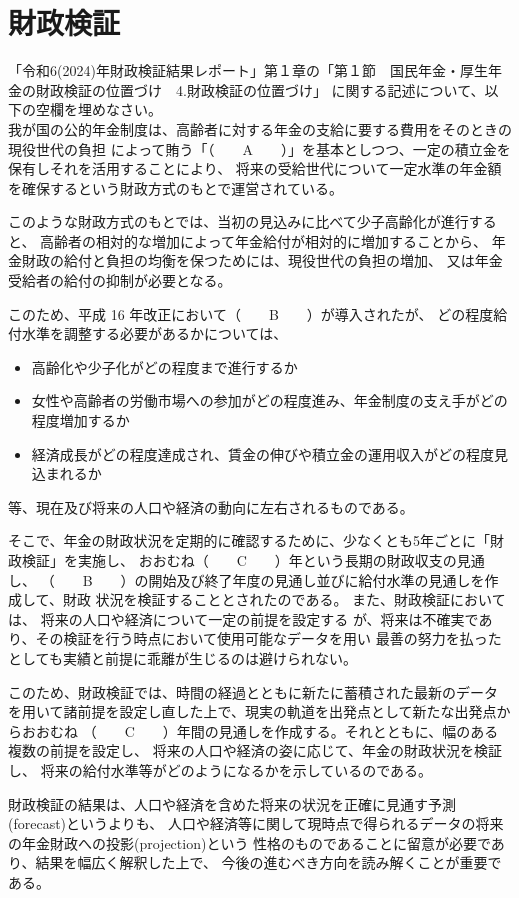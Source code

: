 \section{財政検証}

\begin{fillblank}[自作 2026/11/3]
  「令和6(2024)年財政検証結果レポート」第１章の「第１節　国民年金・厚生年金の財政検証の位置づけ　4.財政検証の位置づけ」
  に関する記述について、以下の空欄を埋めなさい。
\\


  我が国の公的年金制度は、高齢者に対する年金の支給に要する費用をそのときの現役世代の負担
  によって賄う「（　　A　　）」を基本としつつ、一定の積立金を保有しそれを活用することにより、
  将来の受給世代について一定水準の年金額を確保するという財政方式のもとで運営されている。

  このような財政方式のもとでは、当初の見込みに比べて少子高齢化が進行すると、
  高齢者の相対的な増加によって年金給付が相対的に増加することから、
  年金財政の給付と負担の均衡を保つためには、現役世代の負担の増加、
  又は年金受給者の給付の抑制が必要となる。

  このため、平成 16 年改正において（　　B　　）が導入されたが、
  どの程度給付水準を調整する必要があるかについては、
  \begin{itemize}
    \item 高齢化や少子化がどの程度まで進行するか
    \item 女性や高齢者の労働市場への参加がどの程度進み、年金制度の支え手がどの程度増加するか
    \item 経済成長がどの程度達成され、賃金の伸びや積立金の運用収入がどの程度見込まれるか
  \end{itemize}
  等、現在及び将来の人口や経済の動向に左右されるものである。
  
  そこで、年金の財政状況を定期的に確認するために、少なくとも5年ごとに「財政検証」を実施し、
  おおむね（　　C　　）年という長期の財政収支の見通し、
  （　　B　　）の開始及び終了年度の見通し並びに給付水準の見通しを作成して、財政
  状況を検証することとされたのである。 また、財政検証においては、
  将来の人口や経済について一定の前提を設定する
  が、将来は不確実であり、その検証を行う時点において使用可能なデータを用い
  最善の努力を払ったとしても実績と前提に乖離が生じるのは避けられない。

  このため、財政検証では、時間の経過とともに新たに蓄積された最新のデータ
  を用いて諸前提を設定し直した上で、現実の軌道を出発点として新たな出発点からおおむね
  （　　C　　）年間の見通しを作成する。それとともに、幅のある複数の前提を設定し、
  将来の人口や経済の姿に応じて、年金の財政状況を検証し、
  将来の給付水準等がどのようになるかを示しているのである。

  財政検証の結果は、人口や経済を含めた将来の状況を正確に見通す予測 (forecast)というよりも、
  人口や経済等に関して現時点で得られるデータの将来の年金財政への投影(projection)という
  性格のものであることに留意が必要であり、結果を幅広く解釈した上で、
  今後の進むべき方向を読み解くことが重要である。

\end{fillblank}

